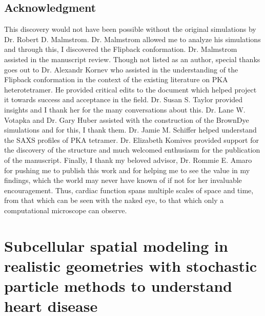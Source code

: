 \documentclass[12pt]{ucsddissertation}
\begin{document}
\section{Acknowledgment}
This discovery would not have been possible without the original simulations by Dr. Robert D. Malmstrom. Dr. Malmstrom allowed me to analyze his simulations and through this, I discovered the Flipback conformation. Dr. Malmstrom assisted in the manuscript review. Though not listed as an author, special thanks goes out to Dr. Alexandr Kornev who assisted in the understanding of the Flipback conformation in the context of the existing literature on PKA heterotetramer. He provided critical edits to the document which helped project it towards success and acceptance in the field. Dr. Susan S. Taylor provided insights and I thank her for the many conversations about this. Dr. Lane W. Votapka and Dr. Gary Huber assisted with the construction of the BrownDye simulations and for this, I thank them. Dr. Jamie M. Schiffer helped understand the SAXS profiles of PKA tetramer. Dr. Elizabeth Komives provided support for the discovery of the structure and much welcomed enthusiasm for the publication of the manuscript. Finally, I thank my beloved advisor, Dr. Rommie E. Amaro for pushing me to publish this work and for helping me to see the value in my findings, which the world may never have known of if not for her invaluable encouragement. Thus, cardiac function spans multiple scales of space and time, from that which can be seen with the naked eye, to that which only a computational microscope can observe.





\chapter{Subcellular spatial modeling in realistic geometries with stochastic particle methods to understand heart disease}
\end{document}
